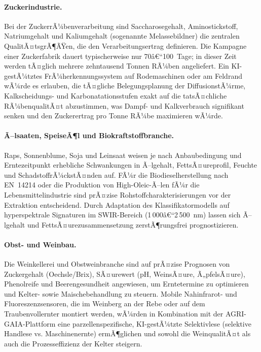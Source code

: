 ﻿\documentclass[12pt,a4paper]{article}
\theoremstyle{plain}
\theoremstyle{definition}
\begin{document}
	\paragraph{Zuckerindustrie.}
	Bei der ZuckerrÃ¼benverarbeitung sind Saccharosegehalt, Aminostickstoff,
	Natriumgehalt und Kaliumgehalt (sogenannte Melassebildner) die zentralen
	QualitÃ¤tsgrÃ¶ÃŸen, die den Verarbeitungsertrag definieren. Die Kampagne einer
	Zuckerfabrik dauert typischerweise nur 70â€“100~Tage; in dieser Zeit werden
	tÃ¤glich mehrere zehntausend Tonnen RÃ¼ben angeliefert. Ein KI-gestÃ¼tztes
	FrÃ¼herkennungssystem auf Rodemaschinen oder am Feldrand wÃ¼rde es erlauben,
	die tÃ¤gliche Belegungsplanung der DiffusionstÃ¼rme, Kalkscheidungs- und
	Karbonatationsstufen exakt auf die tatsÃ¤chliche RÃ¼benqualitÃ¤t abzustimmen,
	was Dampf- und Kalkverbrauch signifikant senken und den Zuckerertrag pro
	Tonne RÃ¼be maximieren wÃ¼rde.

	\paragraph{Ã–lsaaten, SpeiseÃ¶l und Biokraftstoffbranche.}
	Raps, Sonnenblume, Soja und Leinsaat weisen je nach Anbaubedingung und
	Erntezeitpunkt erhebliche Schwankungen in Ã–lgehalt, FettsÃ¤ureprofil,
	Feuchte und SchadstoffrÃ¼ckstÃ¤nden auf. FÃ¼r die Biodieselherstellung nach
	EN~14214 oder die Produktion von High-Oleic-Ã–len fÃ¼r die Lebensmittelindustrie
	sind prÃ¤zise Rohstoffcharakterisierungen vor der Extraktion entscheidend.
	Durch Adaptation des Klassifikatormodells auf hyperspektrale Signaturen im
	SWIR-Bereich (1\,000â€“2\,500~nm) lassen sich Ã–lgehalt und FettsÃ¤urezusammensetzung
	zerstÃ¶rungsfrei prognostizieren.

	\paragraph{Obst- und Weinbau.}
	Die Weinkellerei und Obstweinbranche sind auf prÃ¤zise Prognosen von
	Zuckergehalt (Oechsle/Brix), SÃ¤urewert (pH, WeinsÃ¤ure, Ã„pfelsÃ¤ure),
	Phenolreife und Beerengesundheit angewiesen, um Erntetermine zu optimieren
	und Kelter- sowie Maischebehandlung zu steuern. Mobile Nahinfrarot- und
	Fluoreszenzsensoren, die im Weinberg an der Rebe oder auf dem
	Traubenvollernter montiert werden, wÃ¼rden in Kombination mit der
	AGRI-GAIA-Plattform eine parzellenspezifische, KI-gestÃ¼tzte
	Selektivlese (selektive Handlese vs. Maschinenernte) ermÃ¶glichen und
	sowohl die WeinqualitÃ¤t als auch die Prozesseffizienz der Kelter steigern.
\end{document}
